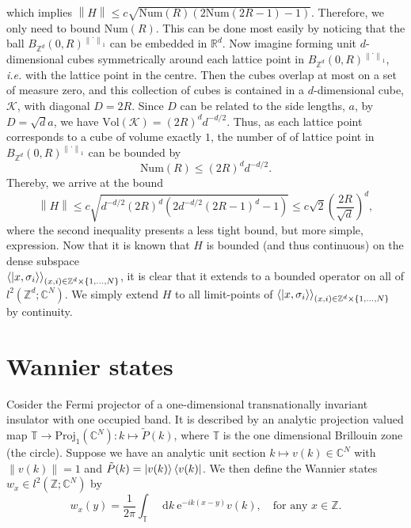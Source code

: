 \documentclass[a4paper,11pt]{article}
\newcommand{\euler}[1]{\text{e}^{#1}}
\newcommand{\norm}[1]{\left\lVert #1 \right\rVert}
\newcommand*\diff{\mathop{}\!\mathrm{d}}
\newcommand{\ie}{\emph{i.e.} }
\newcommand{\R}{\mathbb{R}}
\newcommand{\C}{\mathbb{C}}
\newcommand{\Z}{\mathbb{Z}}
\numberwithin{equation}{section}
\begin{document}
 	 which implies $ \norm{H}\leq c\sqrt{\text{Num}(R)(2\text{Num}(2R-1)-1)} $. Therefore, we only need to bound $ \text{Num}(R) $. This can be done most easily by noticing that the ball $ B_{\Z^d}(0,R)^{\norm{\cdot}_1} $ can be embedded in $ \R^d $. Now imagine forming unit $ d $-dimensional cubes symmetrically around each lattice point in $ B_{\Z^d}(0,R)^{\norm{\cdot}_1} $, \ie with the lattice point in the centre. Then the cubes overlap at most on a set of measure zero, and this collection of cubes is contained in a $ d $-dimensional cube, $ \mathcal{K} $, with diagonal $ D=2R $. Since $ D $ can be related to the side lengths, $ a $, by $ D=\sqrt{d}a $, we have $ \text{Vol}(\mathcal{K})=(2R)^d d^{-d/2} $. Thus, as each lattice point corresponds to a cube of volume exactly $ 1 $, the number of of lattice point in $ B_{\Z^d}(0,R)^{\norm{\cdot}_1} $ can be bounded by\begin{equation}
 	 \text{Num}(R)\leq(2R)^dd^{-d/2}.
 	 \end{equation}
 	 Thereby, we arrive at the bound\begin{equation}
 	 \norm{H}\leq c\sqrt{ d^{-d/2} (2R)^d \left(2 d^{-d/2} (2 R-1)^d-1\right)}\leq c\sqrt{2}\left(\frac{2R}{\sqrt{d}}\right)^d,
 	 \end{equation}
 	 where the second inequality presents a less tight bound, but more simple, expression.
 	 Now that it is known that $ H $ is bounded (and thus continuous) on the dense subspace\\ $ \braket{\ket{x,\sigma_i}}_{(x,i)\in\Z^d\times\{1,...,N\}} $, it is clear that it extends to a bounded operator on all of $ l^2(\Z^d;\C^N) $. We simply extend $ H $ to all limit-points of $ \braket{\ket{x,\sigma_i}}_{(x,i)\in\Z^d\times\{1,...,N\}} $ by continuity.
 	 
	\section{Wannier states}
	Cosider the Fermi projector of a one-dimensional transnationally invariant insulator with one occupied band. It is described by an analytic projection valued map $ \mathbb{T}\to \text{Proj}_1(\C^N): k\mapsto \tilde{P}(k) $, where $ \mathbb{T} $ is the one dimensional Brillouin zone (the circle).
	Suppose we have an analytic unit section $ k\mapsto v(k)\in \C^N $ with $ \norm{v(k)}=1 $ and $ \tilde{P}(k)=\ket{v(k)}\bra{v(k)} $. We then define the Wannier states $ w_x\in l^2(\Z;\C^N) $ by\begin{equation}
	w_x(y)=\frac{1}{2\pi}\int_{\mathbb{T}}\diff k\ \euler{-ik(x-y)}v(k),\quad\text{for any }x\in\Z.
	\end{equation}
\end{document}
